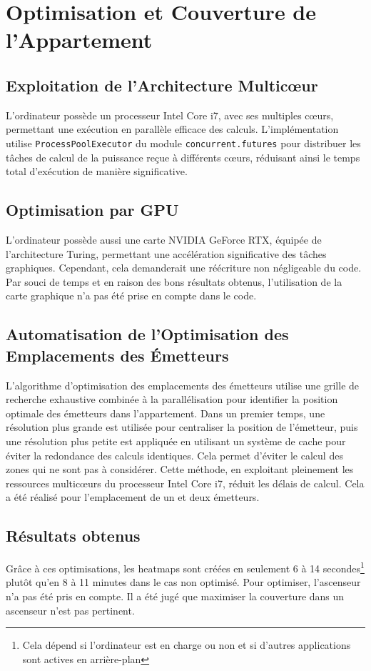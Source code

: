 \section{Optimisation et Couverture de l'Appartement}

\subsection*{Exploitation de l'Architecture Multicœur}
L'ordinateur possède un processeur Intel Core i7, avec ses multiples cœurs, permettant une exécution en parallèle efficace des calculs. L'implémentation utilise \texttt{ProcessPoolExecutor} du module \texttt{concurrent.futures} pour distribuer les tâches de calcul de la puissance reçue à différents cœurs, réduisant ainsi le temps total d'exécution de manière significative.

\subsection{Optimisation par GPU}
L'ordinateur possède aussi une carte NVIDIA GeForce RTX, équipée de l'architecture Turing, permettant une accélération significative des tâches graphiques. Cependant, cela demanderait une réécriture non négligeable du code. Par souci de temps et en raison des bons résultats obtenus, l'utilisation de la carte graphique n'a pas été prise en compte dans le code.

\subsection{Automatisation de l'Optimisation des Emplacements des Émetteurs}
L'algorithme d'optimisation des emplacements des émetteurs utilise une grille de recherche exhaustive combinée à la parallélisation pour identifier la position optimale des émetteurs dans l'appartement. Dans un premier temps, une résolution plus grande est utilisée pour centraliser la position de l'émetteur, puis une résolution plus petite est appliquée en utilisant un système de cache pour éviter la redondance des calculs identiques. Cela permet d'éviter le calcul des zones qui ne sont pas à considérer. Cette méthode, en exploitant pleinement les ressources multicœurs du processeur Intel Core i7, réduit les délais de calcul. Cela a été réalisé pour l'emplacement de un et deux émetteurs.

\subsection{Résultats obtenus}
Grâce à ces optimisations, les heatmaps sont créées en seulement 6 à 14 secondes\footnote{Cela dépend si l'ordinateur est en charge ou non et si d'autres applications sont actives en arrière-plan} plutôt qu'en 8 à 11 minutes dans le cas non optimisé. Pour optimiser, l'ascenseur n'a pas été pris en compte. Il a été jugé que maximiser la couverture dans un ascenseur n'est pas pertinent.
